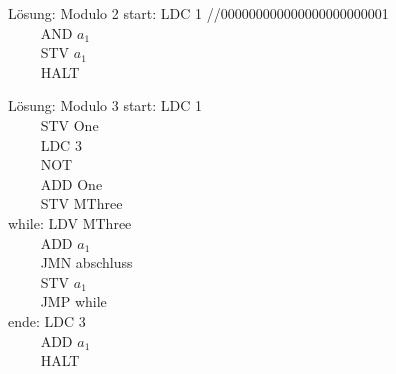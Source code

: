 \begin{frame}{Lösung: Modulo 2}
	start:   LDC 1 //000000000000000000000001 \\
	$\qquad$ AND $a_1$ \\
	$\qquad$ STV $a_1$ \\
	$\qquad$ HALT
\end{frame}

\begin{frame}{Lösung: Modulo 3}
	start:   LDC 1 \\
	$\qquad$ STV One\\
	$\qquad$ LDC 3\\
	$\qquad$ NOT\\
	$\qquad$ ADD One\\
	$\qquad$ STV MThree\\
	\medskip
	while:   LDV MThree\\
	$\qquad$ ADD $a_1$\\
	$\qquad$ JMN abschluss\\
	$\qquad$ STV $a_1$\\
	$\qquad$ JMP while\\
	\medskip
	ende:    LDC 3\\
	$\qquad$ ADD $a_1$\\
	$\qquad$ HALT\\
\end{frame}